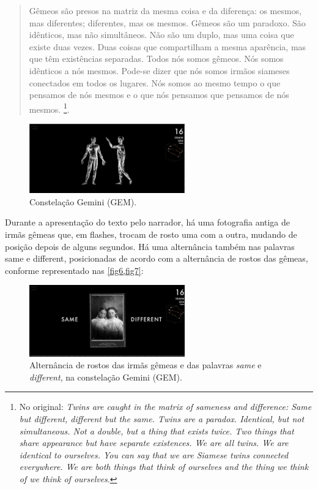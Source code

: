 \documentclass[portuguese]{textolivre}
\begin{document}
\begin{quote}
Gêmeos são presos na matriz da mesma coisa e da diferença: os mesmos, mas diferentes; diferentes, mas os mesmos. Gêmeos são um paradoxo. São idênticos, mas não simultâneos. Não são um duplo, mas uma coisa que existe duas vezes. Duas coisas que compartilham a mesma aparência, mas que têm existências separadas. Todos nós somos gêmeos. Nós somos idênticos a nós mesmos. Pode-se dizer que nós somos irmãos siameses conectados em todos os lugares. Nós somos ao mesmo tempo o que pensamos de nós mesmos e o que nós pensamos que pensamos de nós mesmos. \cite[n. p., tradução nossa]{clark2010}\footnote{No original: \emph{Twins are caught in the matrix of sameness and difference: Same but different, different but the same. Twins are a paradox. Identical, but not simultaneous. Not a double, but a thing that exists twice. Two things that share appearance but have separate existences. We are all twins. We are identical to ourselves. You can say that we are Siamese twins connected everywhere. We are both things that think of ourselves and the thing we think of we think of ourselves}.}.
\end{quote}

\begin{figure}[htbp]
 \centering
 \includegraphics[width=0.6\textwidth]{Fig5[1].jpg}
 \caption{Constelação Gemini (GEM).}
 \label{fig5}
\end{figure}

Durante a apresentação do texto pelo narrador, há uma fotografia antiga de irmãs gêmeas que, em flashes, trocam de rosto uma com a outra, mudando de posição depois de alguns segundos. Há uma alternância também nas palavras same e different, posicionadas de acordo com a alternância de rostos das gêmeas, conforme representado nas \cref{fig6,fig7}: 

\begin{figure}[htbp]
 \centering
 \includegraphics[width=0.6\textwidth]{Fig6[1].jpg}
 \caption{Alternância de rostos das irmãs gêmeas e das palavras \emph{same} e \emph{different}, na constelação Gemini (GEM).}
 \label{fig6}
\end{figure}
\end{document}
